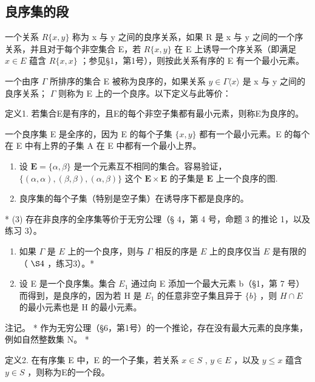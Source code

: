 \subsection{良序集的段}

一个关系 \(R\{x, y\}\) 称为 x 与 y 之间的良序关系，如果 R 是 x 与 y 之间的一个序关系，并且对于每个非空集合 E，若 \(R\{x, y\}\) 在 E 上诱导一个序关系（即满足 \(x \in E\) 蕴含 \(R\{x, x\}\) ；参见§1，第1号），则按此关系有序的 E 有一个最小元素。

一个由序 \(\Gamma\) 所排序的集合 E 被称为良序的，如果关系 \(y \in \Gamma\langle x \rangle\) 是 x 与 y 之间的良序关系； \(\Gamma\) 则称为 E 上的一个良序。以下定义与此等价：

定义1. 若集合E是有序的，且E的每个非空子集都有最小元素，则称E为良序的。

一个良序集 E 是全序的，因为 E 的每个子集 \(\{x, y\}\) 都有一个最小元素。E 的每个在 E 中有上界的子集 A 在 E 中都有一个最小上界。


\begin{enumerate}
\def\labelenumi{(\arabic{enumi})}
\item
  设 \(\mathbf{E} = \{\alpha, \beta\}\) 是一个元素互不相同的集合。容易验证， \(\{(\alpha, \alpha), (\beta, \beta), (\alpha, \beta)\}\) 这个 \(\mathbf{E} \times \mathbf{E}\) 的子集是 \(\mathbf{E}\) 上一个良序的图.
\item
  良序集的每个子集（特别是空子集）在诱导序下都是良序的。
\end{enumerate}

* (3) 存在非良序的全序集等价于无穷公理（§ 4，第 4 号，命题 3 的推论 1，以及练习 3）。

\begin{enumerate}
\def\labelenumi{(\arabic{enumi})}
\setcounter{enumi}{3}
\item
  如果 \(\Gamma\) 是 \(E\) 上的一个良序，则与 \(\Gamma\) 相反的序是 \(E\) 上的良序仅当 \(E\) 是有限的（ \(\S 4\) ，练习3）。*
\item
  设 E 是一个良序集。集合 \(E_{1}\) 通过向 E 添加一个最大元素 b（§1，第 7 号）而得到，是良序的，因为若 H 是 \(E_{1}\) 的任意非空子集且异于 \(\{b\}\) ，则 \(H \cap E\) 的最小元素也是 H 的最小元素。
\end{enumerate}

注记。 * 作为无穷公理（§6，第1号）的一个推论，存在没有最大元素的良序集，例如自然整数集 N。 *

定义2. 在有序集 E 中，E 的一个子集，若关系 \(x \in S\) , \(y \in E\) ，以及 \(y \leqslant x\) 蕴含 \(y \in S\) ，则称为E的一个段。

